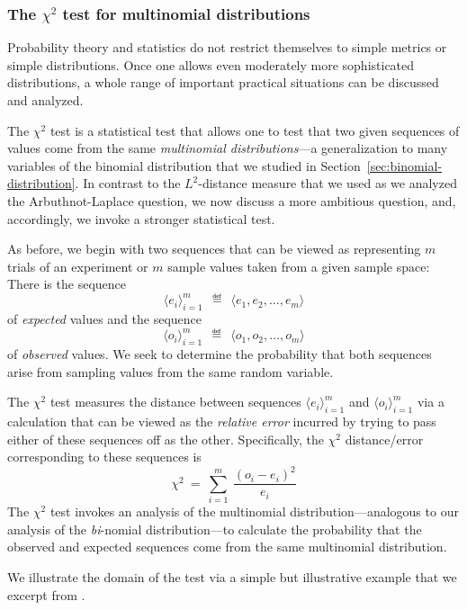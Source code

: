 \subsubsection{The $\chi^2$ test for multinomial distributions}

Probability theory and statistics do not restrict themselves to simple metrics or simple distributions.  Once one allows even moderately more sophisticated distributions, a whole range of important practical situations can be discussed and analyzed.

The $\chi^2$ test is a statistical test that allows one to test that two given sequences of values come from the same {\em multinomial distributions}---a generalization to many variables of the binomial distribution that we studied in Section~\ref{sec:binomial-distribution}.  In contrast to the $L^2$-distance measure that we used as we analyzed the Arbuthnot-Laplace question, we now discuss a more ambitious question, and, accordingly, we invoke a stronger statistical test.

As before, we begin with two sequences that can be viewed as representing $m$ trials of an experiment or $m$ sample values taken from a given sample space:  There is the sequence 
\[ \langle e_i \rangle_{i=1}^m \ \ \eqdef \ \ \langle e_1, e_2, \ldots, e_m \rangle \]
of {\em expected} values and the  sequence
\[ \langle o_i \rangle_{i=1}^m \ \ \eqdef \ \ \langle o_1, o_2, \ldots, o_m \rangle \]
of {\em observed} values.  We seek to determine the probability that both sequences arise from sampling values from the same random variable.

The $\chi^2$ test measures the distance between sequences $\langle e_i \rangle_{i=1}^m$ and $\langle o_i \rangle_{i=1}^m$ via a calculation that can be viewed as the {\em relative error} incurred by trying to pass either of these sequences off as the other.  Specifically, the $\chi^2$ distance/error corresponding to these sequences is
\[ \chi^2 \ = \ \sum_{i=1}^m \ \frac{(o_i- e_i)^2}{e_i} \]
The $\chi^2$ test invokes an analysis of the multinomial distribution---analogous to our analysis of the {\em bi}-nomial distribution---to calculate the probability that the observed and expected sequences come from the same multinomial distribution.

\medskip

We illustrate the domain of the test via a simple but illustrative example that we excerpt from \cite{Hoel58}.

